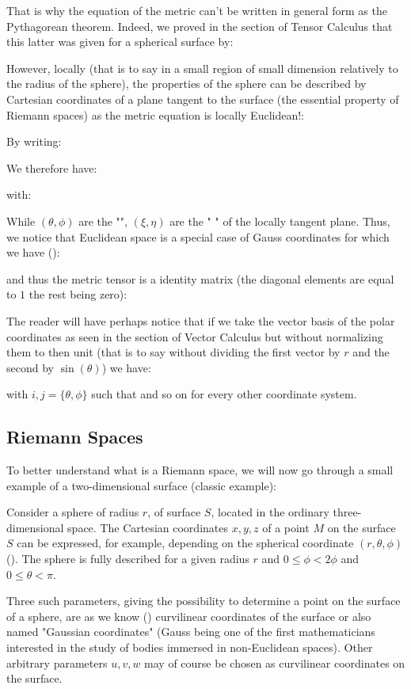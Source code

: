 	That is why the equation of the metric can't be written in general form as the Pythagorean theorem. Indeed, we proved in the section of Tensor Calculus that this latter was given for a spherical surface by:
	
	However, locally (that is to say in a small region of small dimension relatively to the radius of the sphere), the properties of the sphere can be described by Cartesian coordinates of a plane tangent to the surface (the essential property of Riemann spaces) as the metric equation is locally Euclidean!:
	
	By writing:
	
	We therefore have:
	
	with:
	
	While $(\theta,\phi)$ are the "",  $(\xi,\eta)$ are the " " of the locally tangent plane. Thus, we notice that Euclidean space is a special case of Gauss coordinates for which we have ():
	
	and thus the metric tensor is a identity matrix (the diagonal elements are equal to $1$ the rest being zero):
	
	The reader will have perhaps notice that if we take the vector basis of the polar coordinates as seen in the section of Vector Calculus but without normalizing them to then unit (that is to say without dividing the first vector by $r$ and the second by $\sin(\theta)$) we have:
	
	with $i,j=\{\theta,\phi\}$ such that and so on for every other coordinate system.
	
	\pagebreak
	\subsection{Riemann Spaces}
	To better understand what is a Riemann space, we will now go through a small example of a two-dimensional surface (classic example):
	
	Consider a sphere of radius $r$, of surface $S$, located in the ordinary three-dimensional space. The Cartesian coordinates $x, y, z$ of a point $M$ on the surface $S$ can be expressed, for example, depending on the spherical coordinate $(r,\theta,\phi)$ (). The sphere is fully described for a given radius $r$ and $0\leq \phi < 2\phi$ and $0 \leq \theta < \pi$.
	
	Three such parameters, giving the possibility to determine a point on the surface of a sphere, are as we know () curvilinear coordinates of the surface or also named "Gaussian coordinates" (Gauss being one of the first mathematicians interested in the study of bodies immersed in non-Euclidean spaces). Other arbitrary parameters $u, v, w$ may of course be chosen as curvilinear coordinates on the surface.
	
